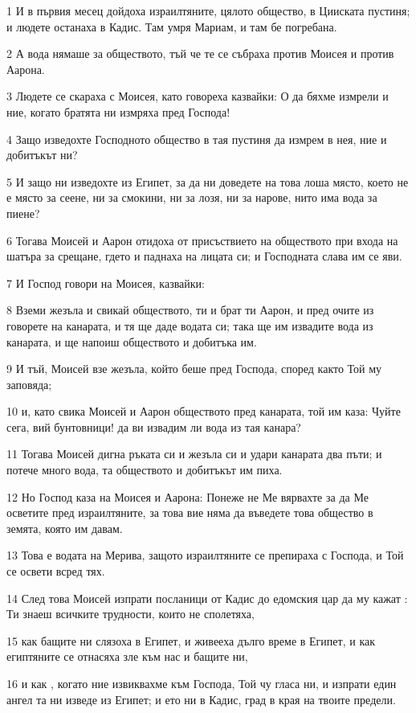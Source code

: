 \par 1 И в първия месец дойдоха израилтяните, цялото общество, в Цииската пустиня; и людете останаха в Кадис. Там умря Мариам, и там бе погребана.
\par 2 А вода нямаше за обществото, тъй че те се събраха против Моисея и против Аарона.
\par 3 Людете се скараха с Моисея, като говореха казвайки: О да бяхме измрели и ние, когато братята ни измряха пред Господа!
\par 4 Защо изведохте Господното общество в тая пустиня да измрем в нея, ние и добитъкът ни?
\par 5 И защо ни изведохте из Египет, за да ни доведете на това лоша място, което не е място за сеене, ни за смокини, ни за лозя, ни за нарове, нито има вода за пиене?
\par 6 Тогава Моисей и Аарон отидоха от присъствието на обществото при входа на шатъра за срещане, гдето и паднаха на лицата си; и Господната слава им се яви.
\par 7 И Господ говори на Моисея, казвайки:
\par 8 Вземи жезъла и свикай обществото, ти и брат ти Аарон, и пред очите из говорете на канарата, и тя ще даде водата си; така ще им извадите вода из канарата, и ще напоиш обществото и добитъка им.
\par 9 И тъй, Моисей взе жезъла, който беше пред Господа, според както Той му заповяда;
\par 10 и, като свика Моисей и Аарон обществото пред канарата, той им каза: Чуйте сега, вий бунтовници! да ви извадим ли вода из тая канара?
\par 11 Тогава Моисей дигна ръката си и жезъла си и удари канарата два пъти; и потече много вода, та обществото и добитъкът им пиха.
\par 12 Но Господ каза на Моисея и Аарона: Понеже не Ме вярвахте за да Ме осветите пред израилтяните, за това вие няма да въведете това общество в земята, която им давам.
\par 13 Това е водата на Мерива, защото израилтяните се препираха с Господа, и Той се освети всред тях.
\par 14 След това Моисей изпрати посланици от Кадис до едомския цар да му кажат : Ти знаеш всичките трудности, които не сполетяха,
\par 15 как бащите ни слязоха в Египет, и живееха дълго време в Египет, и как египтяните се отнасяха зле към нас и бащите ни,
\par 16 и как , когато ние извиквахме към Господа, Той чу гласа ни, и изпрати един ангел та ни изведе из Египет; и ето ни в Кадис, град в края на твоите предели.
